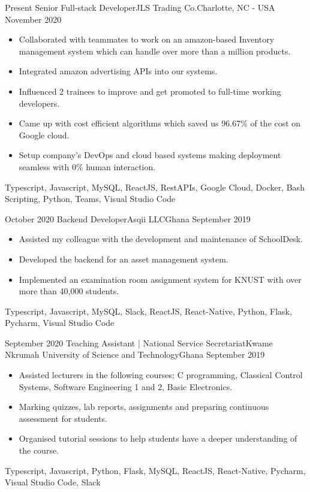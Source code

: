\begin{experiences}
      \experience
    {Present}   {Senior Full-stack Developer}{JLS Trading Co.}{Charlotte, NC - USA}
    {November 2020} {
                      \begin{itemize}
			\item Collaborated with teammates to work on an amazon-based Inventory management system which can handle over more than a million products.
			\item Integrated amazon advertising APIs into our systems.
			\item Influenced 2 trainees to improve and get promoted to full-time working developers.
			\item Came up with cost efficient algorithms which saved us 96.67\% of the cost on Google cloud.
			\item Setup company’s DevOps and cloud based systems making deployment seamless with 0\% human interaction.
		    \end{itemize}
                    }
                    {Typescript, Javascript, MySQL, ReactJS, RestAPIs, Google Cloud, Docker, Bash Scripting, Python, Teams, Visual Studio Code}
  \emptySeparator

  
  \experience
    {October 2020}   {Backend Developer}{Asqii LLC}{Ghana}
    {September 2019} {
                      \begin{itemize}
                        \item Assisted my colleague with the development and maintenance of SchoolDesk.
                        \item Developed the backend for an asset management system.
                        \item Implemented an examination room assignment system for KNUST with over more than 40,000 students.
                      \end{itemize}
                    }
                    {Typescript, Javascript, MySQL, Slack, ReactJS, React-Native, Python, Flask, Pycharm, Visual Studio Code}
  \emptySeparator
  
  
    \experience
    {September 2020}   {Teaching Assistant | National Service Secretariat}{Kwame Nkrumah University of Science and Technology}{Ghana}
    {September 2019} {
                      \begin{itemize}
                        \item Assisted lecturers in the following courses; C programming, Classical Control Systems, Software Engineering 1 and 2, Basic Electronics.
                        \item Marking quizzes, lab reports, assignments and preparing continuous assessment for students.
                        \item Organised tutorial sessions to help students have a deeper understanding of the course.
                      \end{itemize}
                    }
                    {Typescript, Javascript, Python, Flask, MySQL, ReactJS, React-Native, Pycharm, Visual Studio Code, Slack}
  \emptySeparator
  

\end{experiences}
